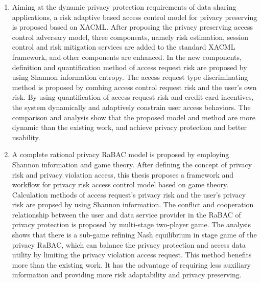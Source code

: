 \begin{englishabstract}
\begin{enumerate}
		\item 	
		Aiming at the dynamic privacy protection requirements of data sharing applications, a risk adaptive based access control model for privacy preserving is proposed based on XACML. After proposing the privacy preserving access control adversary model, three components, namely risk estimation, session control and risk mitigation services are added to the standard XACML framework, and other components are enhanced. In the new components, definition and quantification method of access request risk are proposed by using Shannon information entropy.  The access request type discriminating method is proposed by combing access control request risk  and the user's own risk. By using quantification of access request risk and  credit card incentives, the system dynamically and adaptively constrain user access behaviors. The comparison and analysis show that the proposed model and method are more dynamic than the existing work, and achieve privacy protection and better usability.
		
		\item 		
		A complete rational privacy RaBAC model is proposed by employing Shannon information and game theory. After defining the concept of privacy risk and privacy violation access, this thesis proposes a framework and workflow for privacy risk access control model based on game theory. Calculation methods of access request's privacy risk and  the user's privacy risk are propsed by using Shannon information.
		 The conflict and cooperation relationship between the user and data service provider in the RaBAC of privacy protection is proposed by multi-stage two-player game. The analysis shows that there is a sub-game refining Nash equilibrium in stage game of the privacy RaBAC, which can balance the privacy protection and access data utility by limiting the privacy violation access request. This method benefits more than the existing work. It has the advantage of requiring less auxiliary information and providing more risk adaptability and privacy preserving.
		

\end{enumerate}
\end{englishabstract}
